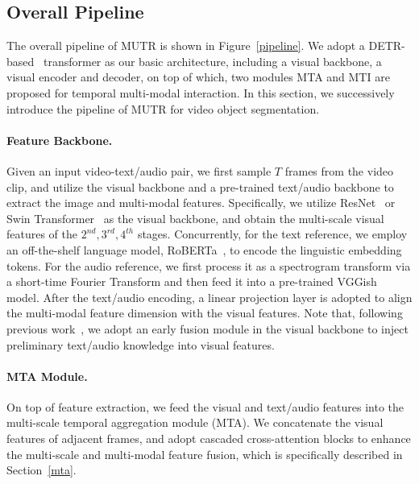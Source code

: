 \documentclass{article}
\begin{document}
\subsection{Overall Pipeline}
\label{overall}
The overall pipeline of MUTR is shown in Figure~\ref{pipeline}. We adopt a DETR-based~\cite{carion2020end} transformer as our basic architecture, including a visual backbone, a visual encoder and decoder, on top of which, two modules MTA and MTI are proposed for temporal multi-modal interaction. In this section, we successively introduce the pipeline of MUTR for video object segmentation.



\paragraph{Feature Backbone.}
Given an input video-text/audio pair, we first sample $T$ frames from the video clip, and utilize the visual backbone and a pre-trained text/audio backbone to extract the image and multi-modal features. Specifically, we utilize ResNet~\cite{he2016deep} or Swin Transformer~\cite{liu2021swin} as the visual backbone, and obtain the multi-scale visual features of the $2^{nd}, 3^{rd}, 4^{th}$ stages. Concurrently, for the text reference, we employ an off-the-shelf language model, RoBERTa~\cite{liu2019roberta}, to encode the linguistic embedding tokens. For the audio reference, we first process it as a spectrogram transform via a short-time Fourier Transform and then feed it into a pre-trained VGGish~\cite{hershey2017cnn} model. After the text/audio encoding, a linear projection layer is adopted to align the multi-modal feature dimension with the visual features. Note that, following previous work~\cite{wu2022language}, we adopt an early fusion module in the visual backbone to inject preliminary text/audio knowledge into visual features. 

\paragraph{MTA Module.}
On top of feature extraction, we feed the visual and text/audio features into the multi-scale temporal aggregation module (MTA). We concatenate the visual features of adjacent frames, and adopt cascaded cross-attention blocks to enhance the multi-scale and multi-modal feature fusion, which is specifically described in Section~\ref{mta}.
\end{document}
